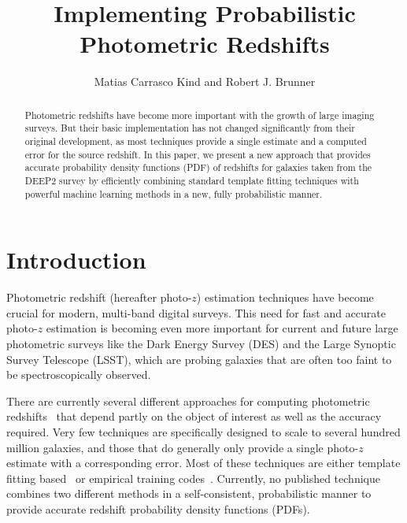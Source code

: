
\resetcounters



\title{Implementing Probabilistic Photometric Redshifts}
\author{Matias Carrasco Kind and Robert J. Brunner
}


\begin{abstract}
Photometric redshifts have become more important with the growth of large imaging surveys. But their basic implementation has not changed significantly from their original development, as most techniques provide a single estimate and a computed error for the source redshift. In this paper, we present a new approach that provides accurate probability density functions (PDF) of redshifts for galaxies taken from the DEEP2 survey  by efficiently combining standard template fitting techniques with powerful machine learning methods in a new, fully probabilistic manner.
\end{abstract}

\section{Introduction}
Photometric redshift (hereafter photo-$z$) estimation techniques have become crucial for modern, multi-band digital surveys. This need for fast and accurate photo-$z$ estimation is becoming even more important for current and future large photometric surveys like the Dark Energy Survey (DES) and the Large Synoptic Survey Telescope (LSST), which are probing galaxies that are often too faint to be spectroscopically observed. 

There are currently several different approaches for computing photometric redshifts~\citep[see, \textit{ e.g.},][for an updated comparison of current photometric redshift methods and public codes]{Hildebrandt2010,Abdalla2011} that depend partly on the object of interest as well as the accuracy required. Very few techniques are specifically designed to scale to several hundred million galaxies, and those that do generally only provide a single photo-$z$ estimate with a corresponding error. Most of these techniques are either template fitting based~\citep[\textit{e.g.,}][]{Benitez2000} or empirical training codes~\citep[\textit{e.g.,}][]{Carrasco2013}. Currently, no published technique combines two different methods in a self-consistent, probabilistic manner to provide accurate redshift probability density functions (PDFs).

